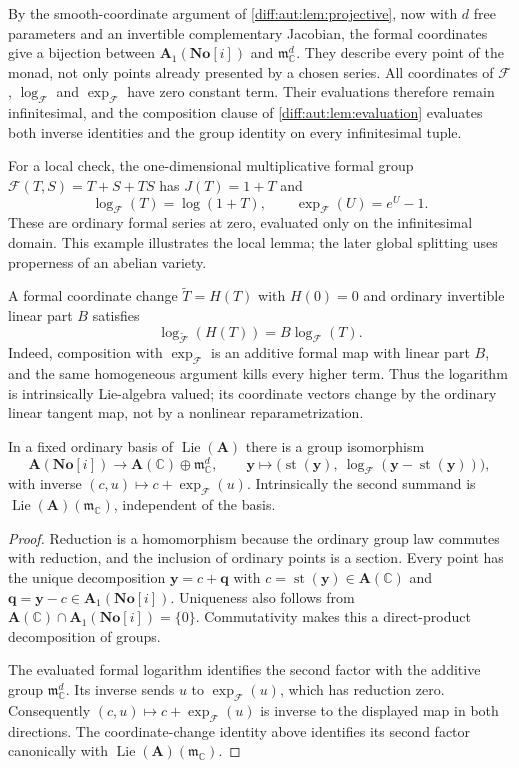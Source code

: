 \documentclass[11pt,letterpaper]{article}
\numberwithin{equation}{section}
\theoremstyle{definition}
\theoremstyle{remark}
\newcommand{\SC}{\mathbf{No}[i]}
\newcommand{\C}{\mathbb C}
\newcommand{\mm}{\mathfrak m}
\newcommand{\st}{\operatorname{st}}
\newcommand{\Lie}{\operatorname{Lie}}
\begin{document}
By the smooth-coordinate argument of \cref{diff:aut:lem:projective},
now with $d$ free parameters and an invertible complementary Jacobian,
the formal coordinates give a bijection between
$\mathbf A_1(\SC)$ and $\mm_\C^d$. They describe every point of
the monad, not only points already presented by a chosen series.
All coordinates of $\mathcal F$, $\log_{\mathcal F}$ and
$\exp_{\mathcal F}$ have zero constant term. Their evaluations
therefore remain infinitesimal, and the composition clause of
\cref{diff:aut:lem:evaluation} evaluates both inverse identities
and the group identity on every infinitesimal tuple.

For a local check, the one-dimensional multiplicative formal group
$\mathcal F(T,S)=T+S+TS$ has $J(T)=1+T$ and
\[
 \log_{\mathcal F}(T)=\log(1+T),\qquad
 \exp_{\mathcal F}(U)=e^U-1.
\]
These are ordinary formal series at zero, evaluated only on the
infinitesimal domain. This example illustrates the local lemma;
the later global splitting uses properness of an abelian variety.

A formal coordinate change $\widetilde T=H(T)$ with $H(0)=0$
and ordinary invertible linear part $B$ satisfies
\[
 \log_{\widetilde{\mathcal F}}(H(T))=B\log_{\mathcal F}(T).
\]
Indeed, composition with $\exp_{\mathcal F}$ is an additive
formal map with linear part $B$, and the same homogeneous argument
kills every higher term. Thus the logarithm is intrinsically
Lie-algebra valued; its coordinate vectors change by the ordinary
linear tangent map, not by a nonlinear reparametrization.

\begin{proposition}
\label{diff:aut:prop:abeliansplit}
In a fixed ordinary basis of $\Lie(\mathbf A)$ there is a group isomorphism
\begin{equation}\label{diff:aut:eq:abeliansplit}
 \mathbf A(\SC)\longrightarrow\mathbf A(\C)\oplus\mm_{\C}^{d},
 \qquad
 \mathbf y\longmapsto\bigl(\st(\mathbf y),\ \log_{\mathcal F}(\mathbf y-\st(\mathbf y))\bigr),
\end{equation}
with inverse $(c,u)\mapsto c+\exp_{\mathcal F}(u)$. Intrinsically the second
summand is $\Lie(\mathbf A)(\mm_{\C})$, independent of the basis.
\end{proposition}
\begin{proof}
Reduction is a homomorphism because the ordinary group law commutes
with reduction, and the inclusion of ordinary points is a section.
Every point has the unique decomposition
$\mathbf y=c+\mathbf q$ with
$c=\st(\mathbf y)\in\mathbf A(\C)$ and
$\mathbf q=\mathbf y-c\in\mathbf A_1(\SC)$.
Uniqueness also follows from
$\mathbf A(\C)\cap\mathbf A_1(\SC)=\{0\}$.
Commutativity makes this a direct-product decomposition of groups.

The evaluated formal logarithm identifies the second factor with
the additive group $\mm_\C^d$. Its inverse sends $u$ to
$\exp_{\mathcal F}(u)$, which has reduction zero. Consequently
$(c,u)\mapsto c+\exp_{\mathcal F}(u)$ is inverse to the displayed
map in both directions. The coordinate-change identity above
identifies its second factor canonically with
$\Lie(\mathbf A)(\mm_\C)$.
\end{proof}
\end{document}
